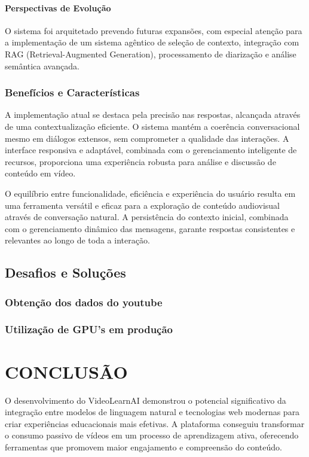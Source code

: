 \documentclass[tcc,capa]{texufpel}
\begin{document}
\subsubsection{Perspectivas de Evolução}
O sistema foi arquitetado prevendo futuras expansões, com especial atenção para a implementação de um sistema agêntico de seleção de contexto, integração com RAG (Retrieval-Augmented Generation), processamento de diarização e análise semântica avançada.

\subsection{Benefícios e Características}
A implementação atual se destaca pela precisão nas respostas, alcançada através de uma contextualização eficiente. O sistema mantém a coerência conversacional mesmo em diálogos extensos, sem comprometer a qualidade das interações. A interface responsiva e adaptável, combinada com o gerenciamento inteligente de recursos, proporciona uma experiência robusta para análise e discussão de conteúdo em vídeo.

O equilíbrio entre funcionalidade, eficiência e experiência do usuário resulta em uma ferramenta versátil e eficaz para a exploração de conteúdo audiovisual através de conversação natural. A persistência do contexto inicial, combinada com o gerenciamento dinâmico das mensagens, garante respostas consistentes e relevantes ao longo de toda a interação.



\section{Desafios e Soluções}
\subsection{Obtenção dos dados do youtube}
\subsection{Utilização de GPU's em produção}





\chapter{CONCLUSÃO}

O desenvolvimento do VideoLearnAI demonstrou o potencial significativo da integração entre modelos de linguagem natural e tecnologias web modernas para criar experiências educacionais mais efetivas. A plataforma conseguiu transformar o consumo passivo de vídeos em um processo de aprendizagem ativa, oferecendo ferramentas que promovem maior engajamento e compreensão do conteúdo.
\end{document}
